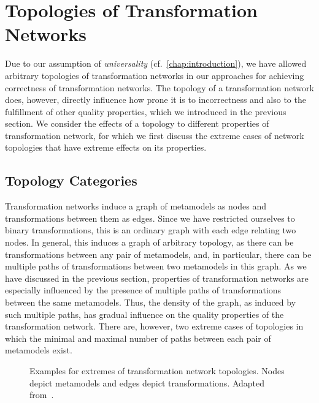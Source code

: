 \section{Topologies of Transformation Networks}

Due to our assumption of \emph{universality} (cf.\ \autoref{chap:introduction}), we have allowed arbitrary topologies of transformation networks in our approaches for achieving correctness of transformation networks.
The topology of a transformation network does, however, directly influence how prone it is to incorrectness and also to the fulfillment of other quality properties, which we introduced in the previous section.
We consider the effects of a topology to different properties of transformation network, for which we first discuss the extreme cases of network topologies that have extreme effects on its properties.


\subsection{Topology Categories}

Transformation networks induce a graph of metamodels as nodes and transformations between them as edges.
Since we have restricted ourselves to binary transformations, this is an ordinary graph with each edge relating two nodes.
In general, this induces a graph of arbitrary topology, as there can be transformations between any pair of metamodels, and, in particular, there can be multiple paths of transformations between two metamodels in this graph.
As we have discussed in the previous section, properties of transformation networks are especially influenced by the presence of multiple paths of transformations between the same metamodels.
Thus, the density of the graph, as induced by such multiple paths, has gradual influence on the quality properties of the transformation network.
There are, however, two extreme cases of topologies in which the minimal and maximal number of paths between each pair of metamodels exist.

\begin{figure}
    \centering
    \begin{minipage}[b]{0.49\columnwidth}
        \centering
        
        \label{fig:classification:topologies:complete}
    \end{minipage}
    \hfill
    \begin{minipage}[b]{0.49\columnwidth}
        \centering
        
        \vspace{1em}
        \label{fig:classification:topologies:tree}
    \end{minipage}
    \caption[Extremes of transformation network topologies]{Examples for extremes of transformation network topologies. Nodes depict metamodels and edges depict transformations. Adapted from~.}
    \label{fig:classification:topologies}
\end{figure}

